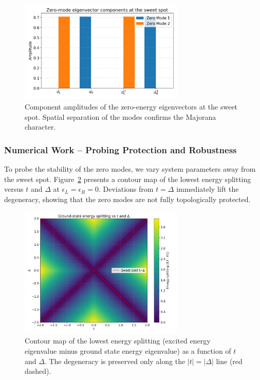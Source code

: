 \documentclass[11pt, letterpaper, titlepage]{article}
\begin{document}
\begin{figure}[htbp]
  \centering
  \includegraphics[width=0.7\textwidth]{../Figures/singlebody_sweetspot_zero_modes.png}
  \caption{Component amplitudes of the zero-energy eigenvectors at the sweet spot. Spatial separation of the modes confirms the Majorana character.}
  \label{fig:sb_zero_modes}
\end{figure}

\subsubsection{Numerical Work – Probing Protection and Robustness}

To probe the stability of the zero modes, we vary system parameters away from the sweet spot. Figure~\ref{fig:sb_grid} presents a contour map of the lowest energy splitting versus $t$ and $\Delta$ at $\epsilon_L = \epsilon_R = 0$. Deviations from $t = \Delta$ immediately lift the degeneracy, showing that the zero modes are not fully topologically protected.

\begin{figure}[htbp]
  \centering
  \includegraphics[width=0.7\textwidth]{../Figures/singlebody_sweetspot_grid.png}
  \caption{Contour map of the lowest energy splitting (excited energy eigenvalue minus ground state energy eigenvalue) as a function of $t$ and $\Delta$. The degeneracy is preserved only along the $|t| = |\Delta|$ line (red dashed).}
  \label{fig:sb_grid}
\end{figure}
\end{document}

